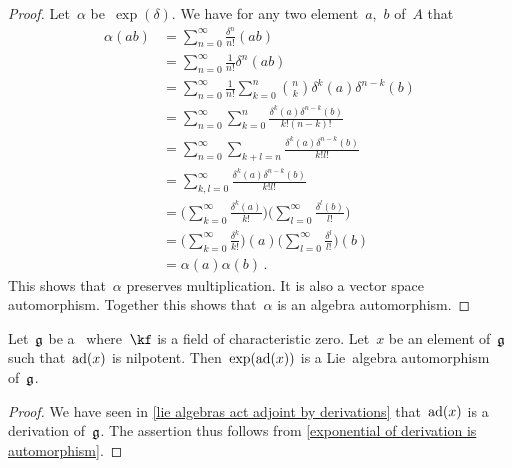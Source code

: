 \begin{proof}
	Let~$\alpha$ be~$\exp(\delta)$.
	We have for any two element~$a$,~$b$ of~$A$ that
	\begingroup
	\allowdisplaybreaks
	\begin{align*}
		\alpha(ab)
		&=
		\sum_{n=0}^\infty
		\frac{\delta^n}{n!}(ab)
		\\
		&=
		\sum_{n=0}^\infty
		\frac{1}{n!}
		\delta^n(ab)
		\\
		&=
		\sum_{n=0}^\infty
		\frac{1}{n!}
		\sum_{k=0}^n
		\binom{n}{k}
		\delta^k(a) \delta^{n-k}(b)
		\\
		&=
		\sum_{n=0}^\infty
		\sum_{k=0}^n
		\frac{\delta^k(a) \delta^{n-k}(b)}{k! (n-k)!}
		\\
		&=
		\sum_{n=0}^\infty
		\sum_{k+l=n}
		\frac{\delta^k(a) \delta^{n-k}(b)}{k! l!}
		\\
		&=
		\sum_{k,l = 0}^\infty
		\frac{\delta^k(a) \delta^{n-k}(b)}{k! l!}
		\\
		&=
		\Biggl(
			\sum_{k=0}^\infty
			\frac{\delta^k(a)}{k!}
		\Biggr)
		\Biggl(
			\sum_{l=0}^\infty
			\frac{\delta^l(b)}{l!}
		\Biggr)
		\\
		&=
		\Biggl(
			\sum_{k=0}^\infty
			\frac{\delta^k}{k!}
		\Biggr)
		(a)
		\Biggl(
			\sum_{l=0}^\infty
			\frac{\delta^l}{l!}
		\Biggr)
		(b)
		\\
		&=
		\alpha(a) \alpha(b) \,. 
	\end{align*}
	\endgroup
	This shows that~$\alpha$ preserves multiplication.
	It is also a vector space automorphism.
	Together this shows that~$\alpha$ is an algebra automorphism.
\end{proof}


\begin{corollary}
	Let~$\mathfrak{g}$ be a~\liealgebra{$\kf$} where~$\kf$ is a field of characteristic zero.
	Let~$x$ be an element of~$\mathfrak{g}$ such that~$\operatorname{ad}(x)$ is nilpotent.
	Then~$\exp(\operatorname{ad}(x))$ is a Lie~algebra automorphism of~$\mathfrak{g}$.
\end{corollary}


\begin{proof}
	We have seen in \cref{lie algebras act adjoint by derivations} that~$\operatorname{ad}(x)$ is a derivation of~$\mathfrak{g}$.
	The assertion thus follows from \cref{exponential of derivation is automorphism}.
\end{proof}


